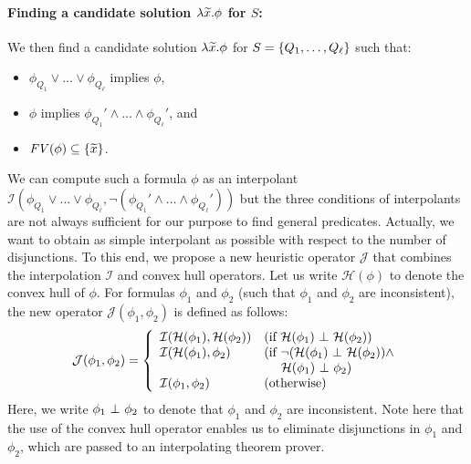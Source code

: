 \paragraph{Finding a candidate solution \(\lambda \widetilde{x}.\phi\) for \(S\):}
We then find a candidate solution \(\lambda \widetilde{x}.\phi\) for \(S = 
\{{Q_1,\dots,Q_{\ell}}\}\) such that:
\vspace{-4pt}
\begin{itemize}
\item \(\phi_{Q_1} \lor \dots \lor \phi_{Q_{\ell}}\) implies \(\phi\),
\item \(\phi\) implies \(\phi_{Q_1}' \land \dots \land \phi_{Q_{\ell}}'\), and
\item \(\mathit{FV}({\phi}) \subseteq \{{\widetilde{x}}\}\).
\end{itemize}
\vspace{-4pt}
We can compute such a formula \(\phi\) as an interpolant
\(\mathcal{I}(\phi_{Q_1} \lor \dots \lor \phi_{Q_{\ell}},\neg
(\phi_{Q_1}' \land \dots \land \phi_{Q_{\ell}}'))\) but the three
conditions of interpolants are not always sufficient for our purpose to
find general predicates.  Actually, we want to obtain as simple
interpolant as possible with respect to the number of disjunctions.
To this end, we propose a new heuristic operator \(\mathcal{J}\) that 
combines the interpolation \(\mathcal{I}\) and convex hull operators.  
Let us write \(\mathcal{H}(\phi)\) to denote the convex hull of \(\phi\). 
 For formulas \(\phi_1\) and \(\phi_2\) (such that \(\phi_1\) and 
\(\phi_2\) are inconsistent), the new operator 
\(\mathcal{J}(\phi_1,\phi_2)\) is defined as follows:
\[
\mathcal{J}(\phi_1,\phi_2) =
\left\{
\begin{array}{ll}
\mathcal{I}(\mathcal{H}(\phi_1),\mathcal{H}(\phi_2)) & (\mbox{if~}\mathcal{H}(\phi_1) \ \bot\  \mathcal{H}(\phi_2)) \\
\mathcal{I}(\mathcal{H}(\phi_1),\phi_2) & (\mbox{if~}\neg (\mathcal{H}(\phi_1) \ \bot\  \mathcal{H}(\phi_2)) \land \\
&\ \quad \mathcal{H}(\phi_1) \ \bot\  \phi_2) \\
\mathcal{I}(\phi_1,\phi_2) & (\mbox{otherwise})
\end{array}
\right.
\]
Here, we write \(\phi_1 \ \bot\  \phi_2\) to denote that \(\phi_1\) and 
\(\phi_2\) are inconsistent.  Note here that the use of the convex hull 
operator enables us to eliminate disjunctions in \(\phi_1\) and 
\(\phi_2\), which are passed to an interpolating theorem prover.
